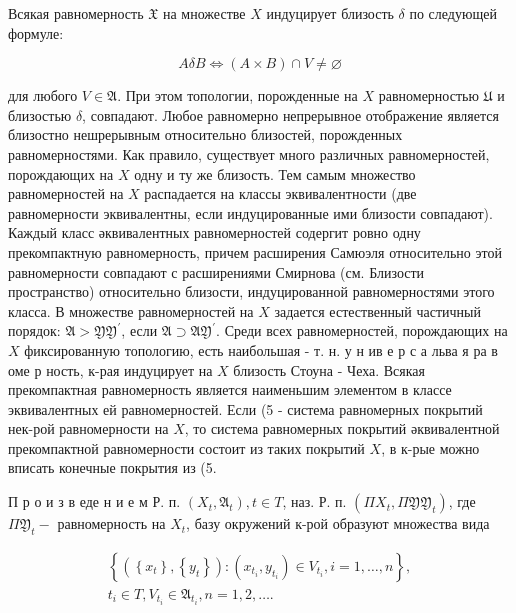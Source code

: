 \documentclass[10pt]{article}
\begin{document}
Всякая равномерность $\mathfrak{X}$ на множестве $X$ индуцирует близость $\delta$ по следующей формуле:



\[

A \delta B \Leftrightarrow(A \times B) \cap V \neq \varnothing

\]



для любого $V \in \mathfrak{A}$. При этом топологии, порожденные на $X$ равномерностью $\mathfrak{U}$ и близостью $\delta$, совпадают. Любое равномерно непрерывное отображение является близостно нешрерывным относительно близостей, порожденных равномерностями. Как правило, существует много различных равномерностей, порождающих на $X$ одну и ту же близость. Тем самым множество равномерностей на $X$ распадается на классы эквивалентности (две равномерности эквивалентны, если индуцированные ими близости совпадают). Каждый класс әквивалентных равномерностей содергит ровно одну прекомпактную равномерность, причем расширения Самюэля относительно этой равномерности совпадают с расширениями Смирнова (см. Близости пространство) относительно близости, индуцированной равномерностями этого класса. В множестве равномерностей на $X$ задается естественный частичный порядок: $\mathfrak{A}>\mathfrak{Y} \mathfrak{Y}^{\prime}$, если $\mathfrak{A} \supset \mathfrak{A} \mathfrak{Y}^{\prime}$. Среди всех равномерностей, порождающих на $X$ фиксированную топологию, есть наибольшая - т. н. у н ив е р с а льва я ра в оме р ность, к-рая индуцирует на $X$ близость Стоуна - Чеха. Всякая прекомпактная равномерность является наименьшим элементом в классе эквивалентных ей равномерностей. Если (5 - система равномерных покрытий нек-рой равномерности на $X$, то система равномерных покрытий әквивалентной прекомпактной равномерности состоит из таких покрытий $X$, в к-рые можно вписать конечные покрытия из (5.



П р о и з в еде н и е м Р. п. $\left(X_{t}, \mathfrak{A}_{t}\right), t \in T$, наз. Р. п. $\left(\Pi X_{t}, \Pi \mathfrak{Y} \mathfrak{Y}_{t}\right)$, где $\Pi \mathfrak{Y}_{t}-$ равномерность на $X_{t}$, базу окружений к-рой образуют множества вида



\[

\begin{gathered}

\left\{\left(\left\{x_{t}\right\},\left\{y_{t}\right\}\right):\left(x_{t_{i}}, y_{t_{i}}\right) \in V_{t_{i}}, i=1, \ldots, n\right\}, \\

t_{i} \in T, V_{t_{i}} \in \mathfrak{A}_{t_{i}}, n=1,2, \ldots .

\end{gathered}

\]
\end{document}
